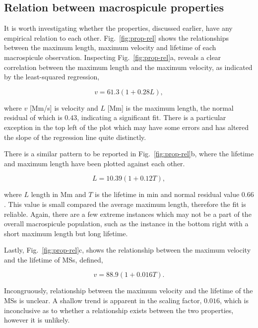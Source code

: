 \subsection{Relation between macrospicule properties}
It is worth investigating whether the properties, discussed earlier, have any empirical relation to each other. Fig.~\ref{fig:prop-rel} shows the relationships between the maximum length, maximum velocity and lifetime of each macrospicule observation. Inspecting Fig.~\ref{fig:prop-rel}a, reveals a clear correlation between the maximum length and the maximum velocity, as indicated by the least-squared regression, 

\begin{equation}
v = 61.3(1 + 0.28L),
\end{equation}

\noindent where $v$ [Mm/s] is velocity and $L$ [Mm] is the maximum length, the normal residual of which is $0.43$, indicating a significant fit. There is a particular exception in the top left of the plot which may have some errors and has altered the slope of the regression line quite distinctly.

There is a similar pattern to be reported in Fig.~\ref{fig:prop-rel}b, where the lifetime and maximum length have been plotted against each other.

\begin{equation}
L = 10.39(1 + 0.12T),
\end{equation}

\noindent where $L$ length in Mm and $T$ is the lifetime in min and normal residual value $0.66$. This value is small compared the average maximum length, therefore the fit is reliable. Again, there are a few extreme instances which may not be a part of the overall macrospicule population, such as the instance in the bottom right with a short maximum length but long lifetime. 

Lastly, Fig.~\ref{fig:prop-rel}c, shows the relationship between the maximum velocity and the lifetime of MSs, defined,

\begin{equation}
v = 88.9(1 + 0.016T).
\end{equation}

Incongruously, relationship between the maximum velocity and the lifetime of the MSs is unclear. A shallow trend is apparent in the scaling factor, $0.016$, which is inconclusive as to whether a relationship exists between the two properties, however it is unlikely.

